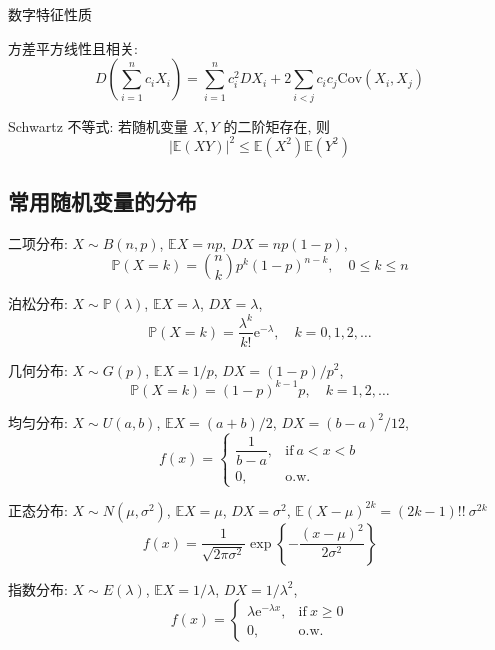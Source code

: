 \documentclass[openany]{ctexbook}
\theoremstyle{kaiti}
\theoremstyle{normal}
\begin{document}
数字特征性质

方差平方线性且相关:
\begin{equation}
  D\left(\sum_{i=1}^nc_iX_i\right)=\sum_{i=1}^nc_i^2DX_i+2\sum_{i<j}c_ic_j\mathrm{Cov}(X_i,X_j)
\end{equation}

Schwartz 不等式: 若随机变量 $X,Y$ 的二阶矩存在, 则
\begin{equation}
  |\mathbb{E}(XY)|^2\leqslant \mathbb{E}(X^2)\mathbb{E}(Y^2)
\end{equation}

\subsection{常用随机变量的分布}

二项分布: $X\sim B(n,p)$, $\mathbb{E}X=np$, $DX=np(1-p)$,
\begin{equation}
  \mathbb{P}(X=k)=\binom{n}{k}p^k(1-p)^{n-k},\quad0\leqslant k\leqslant n
\end{equation}

泊松分布: $X\sim \mathbb{P}(\lambda)$, $\mathbb{E}X=\lambda$, $DX=\lambda$,
\begin{equation}
  \mathbb{P}(X=k)=\frac{\lambda^k}{k!}\mathrm{e}^{-\lambda},\quad k=0,1,2,\ldots
\end{equation}

几何分布: $X\sim G(p)$, $\mathbb{E}X=1/p$, $DX=(1-p)/p^2$,
\begin{equation}
  \mathbb{P}(X=k)=(1-p)^{k-1}p,\quad k=1,2,\ldots
\end{equation}

均匀分布: $X\sim U(a,b)$, $\mathbb{E}X=(a+b)/2$, $DX=(b-a)^2/12$,
\begin{equation}
  f(x)=\begin{cases}\dfrac{1}{b-a},&\text{if}~a<x<b\\0,&\text{o.w.}\end{cases}
\end{equation}

正态分布: $X\sim N(\mu,\sigma^2)$, $\mathbb{E}X=\mu$, $DX=\sigma^2$, $\mathbb{E}(X-\mu)^{2k}=(2k-1)!!~\sigma^{2k}$
\begin{equation}
  f(x)=\frac{1}{\sqrt{2\pi\sigma^2}}\exp\left\{-\frac{(x-\mu)^2}{2\sigma^2}\right\}
\end{equation}

指数分布: $X\sim E(\lambda)$, $\mathbb{E}X=1/\lambda$, $DX=1/\lambda^2$,
\begin{equation}
  f(x)=\begin{cases}\lambda\mathrm{e}^{-\lambda x},&\text{if}~x\geqslant0\\0,&\text{o.w.}\end{cases}
\end{equation}
\end{document}
